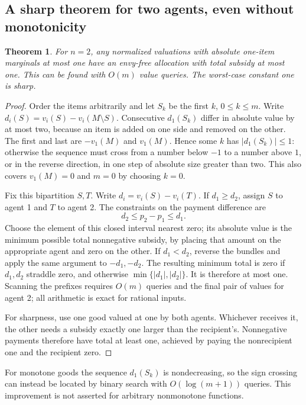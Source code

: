 \documentclass[11pt,a4paper]{article}
\newtheorem{theorem}{Theorem}[section]
\theoremstyle{remark}\newtheorem{remark}[theorem]{Remark}
\begin{document}
\subsection{A sharp theorem for two agents, even without monotonicity}
\begin{theorem}\label{thm:two}
For $n=2$, any normalized valuations with absolute one-item marginals at most one have an envy-free allocation with total subsidy at most one. This can be found with $O(m)$ value queries. The worst-case constant one is sharp.
\end{theorem}
\begin{proof}
Order the items arbitrarily and let $S_k$ be the first $k$, $0\le k\le m$. Write $d_i(S)=v_i(S)-v_i(M\setminus S)$. Consecutive $d_1(S_k)$ differ in absolute value by at most two, because an item is added on one side and removed on the other. The first and last are $-v_1(M)$ and $v_1(M)$. Hence some $k$ has $|d_1(S_k)|\le1$: otherwise the sequence must cross from a number below $-1$ to a number above $1$, or in the reverse direction, in one step of absolute size greater than two. This also covers $v_1(M)=0$ and $m=0$ by choosing $k=0$.

Fix this bipartition $S,T$. Write $d_i=v_i(S)-v_i(T)$. If $d_1\ge d_2$, assign $S$ to agent 1 and $T$ to agent 2. The constraints on the payment difference are
\[
d_2\le p_2-p_1\le d_1.
\]
Choose the element of this closed interval nearest zero; its absolute value is the minimum possible total nonnegative subsidy, by placing that amount on the appropriate agent and zero on the other. If $d_1<d_2$, reverse the bundles and apply the same argument to $-d_1,-d_2$. The resulting minimum total is zero if $d_1,d_2$ straddle zero, and otherwise $\min\{|d_1|,|d_2|\}$. It is therefore at most one. Scanning the prefixes requires $O(m)$ queries and the final pair of values for agent 2; all arithmetic is exact for rational inputs.

For sharpness, use one good valued at one by both agents. Whichever receives it, the other needs a subsidy exactly one larger than the recipient's. Nonnegative payments therefore have total at least one, achieved by paying the nonrecipient one and the recipient zero.
\end{proof}
For monotone goods the sequence $d_1(S_k)$ is nondecreasing, so the sign crossing can instead be located by binary search with $O(\log(m+1))$ queries. This improvement is not asserted for arbitrary nonmonotone functions.
\end{document}
